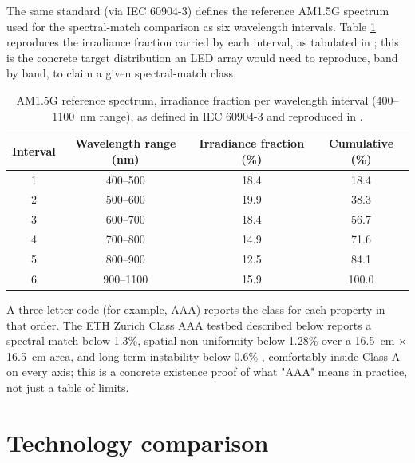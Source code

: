 
The same standard (via IEC 60904-3) defines the reference AM1.5G spectrum used for the spectral-match comparison as six wavelength intervals. Table \ref{tab:am15g-bins} reproduces the irradiance fraction carried by each interval, as tabulated in \cite{schulthess2026classaaa}; this is the concrete target distribution an LED array would need to reproduce, band by band, to claim a given spectral-match class.

\begin{table}[!ht]
\centering
\small
\caption{AM1.5G reference spectrum, irradiance fraction per wavelength interval (400--1100~nm range), as defined in IEC 60904-3 and reproduced in \cite{schulthess2026classaaa}.}
\label{tab:am15g-bins}
\begin{tabular}{cccc}
\toprule
\textbf{Interval} & \textbf{Wavelength range (nm)} & \textbf{Irradiance fraction (\%)} & \textbf{Cumulative (\%)} \\
\midrule
1 & 400--500  & 18.4 & 18.4 \\
2 & 500--600  & 19.9 & 38.3 \\
3 & 600--700  & 18.4 & 56.7 \\
4 & 700--800  & 14.9 & 71.6 \\
5 & 800--900  & 12.5 & 84.1 \\
6 & 900--1100 & 15.9 & 100.0 \\
\bottomrule
\end{tabular}
\end{table}

A three-letter code (for example, AAA) reports the class for each property in that order. The ETH Zurich Class AAA testbed described below reports a spectral match below 1.3\%, spatial non-uniformity below 1.28\% over a 16.5~cm $\times$ 16.5~cm area, and long-term instability below 0.6\% \cite{schulthess2026classaaa}, comfortably inside Class A on every axis; this is a concrete existence proof of what "AAA" means in practice, not just a table of limits.

\section{Technology comparison}


